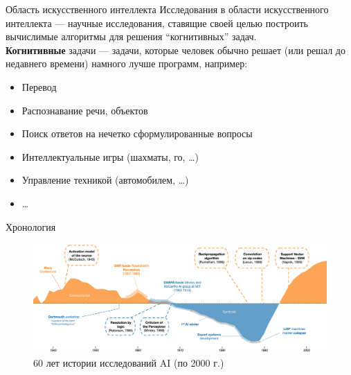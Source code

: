 \documentclass[aspectratio=169]{beamer}
\begin{document}
\begin{frame}{Область искусственного интеллекта}
    Исследования в области искусственного интеллекта --- научные исследования, ставящие
    своей целью построить вычислимые алгоритмы для решения ``когнитивных'' задач.\\
    \pause{}
    \textbf{Когнитивные} задачи --- задачи, которые человек обычно решает
    (или решал до недавнего времени) намного лучше программ, например:
    \begin{itemize}
        \item Перевод
        \item Распознавание речи, объектов
        \item Поиск ответов на нечетко сформулированные вопросы
        \item Интеллектуальные игры (шахматы, го, \ldots)
        \item Управление техникой (автомобилем, \ldots)
        \item \ldots
    \end{itemize}
\end{frame}

\begin{frame}{Хронология}
    \begin{figure}
        \includegraphics[width=\linewidth]{graphs/fig2.jpg}
        \caption*{60 лет истории исследований AI (по 2000 г.)}
    \end{figure}
\end{frame}
\end{document}
